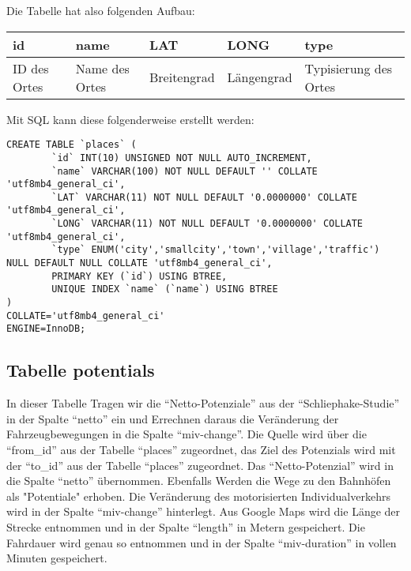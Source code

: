 \documentclass[fontsize=12pt,a4paper]{scrreprt}
\begin{document}
Die Tabelle hat also folgenden Aufbau:
\newline
\newline
\begin{tabular}[h]{|l|l|l|l|l|}
        \hline
        id & name & LAT & LONG & type\\
        \hline
        ID des Ortes & Name des Ortes & Breitengrad & Längengrad & Typisierung des Ortes \\
        \hline
\end{tabular}
\newline
\newline
\newline
Mit SQL kann diese folgenderweise erstellt werden:
\begin{verbatim}
CREATE TABLE `places` (
        `id` INT(10) UNSIGNED NOT NULL AUTO_INCREMENT,
        `name` VARCHAR(100) NOT NULL DEFAULT '' COLLATE 'utf8mb4_general_ci',
        `LAT` VARCHAR(11) NOT NULL DEFAULT '0.0000000' COLLATE 'utf8mb4_general_ci',
        `LONG` VARCHAR(11) NOT NULL DEFAULT '0.0000000' COLLATE 'utf8mb4_general_ci',
        `type` ENUM('city','smallcity','town','village','traffic') NULL DEFAULT NULL COLLATE 'utf8mb4_general_ci',
        PRIMARY KEY (`id`) USING BTREE,
        UNIQUE INDEX `name` (`name`) USING BTREE
)
COLLATE='utf8mb4_general_ci'
ENGINE=InnoDB;
\end{verbatim}

\subsection{Tabelle potentials}

In dieser Tabelle Tragen wir die \enquote{Netto-Potenziale} aus der \enquote{Schliephake-Studie} in der Spalte \enquote{netto} ein und Errechnen daraus die Veränderung der Fahrzeugbewegungen in die Spalte \enquote{miv-change}. Die Quelle wird über die \enquote{from_id} aus der Tabelle \enquote{places} zugeordnet, das Ziel des Potenzials wird mit der \enquote{to_id} aus der Tabelle \enquote{places} zugeordnet. Das \enquote{Netto-Potenzial} wird in die Spalte \enquote{netto} übernommen. Ebenfalls Werden die Wege zu den Bahnhöfen als "Potentiale" erhoben. Die Veränderung des motorisierten Individualverkehrs wird in der Spalte \enquote{miv-change} hinterlegt. Aus Google Maps wird die Länge der Strecke entnommen und in der Spalte \enquote{length} in Metern gespeichert. Die Fahrdauer wird genau so entnommen und in der Spalte \enquote{miv-duration} in vollen Minuten gespeichert.
\end{document}
